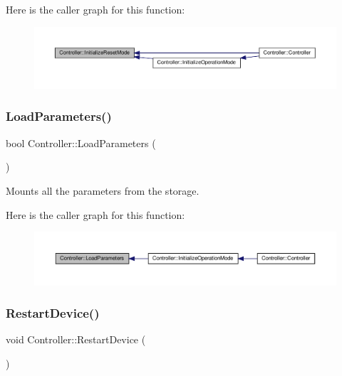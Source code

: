 Here is the caller graph for this function\+:
\nopagebreak
\begin{figure}[H]
\begin{center}
\leavevmode
\includegraphics[width=350pt]{classController_a97450864deedc5aaba0380b52a716292_icgraph}
\end{center}
\end{figure}
\mbox{\label{classController_abcd6a66cbded25a29989e1af162d3a69}} 
\subsubsection{\texorpdfstring{Load\+Parameters()}{LoadParameters()}}
{\footnotesize\ttfamily bool Controller\+::\+Load\+Parameters (\begin{DoxyParamCaption}{ }\end{DoxyParamCaption})\hspace{0.3cm}{\ttfamily [private]}}



Mounts all the parameters from the storage. 

Here is the caller graph for this function\+:
\nopagebreak
\begin{figure}[H]
\begin{center}
\leavevmode
\includegraphics[width=350pt]{classController_abcd6a66cbded25a29989e1af162d3a69_icgraph}
\end{center}
\end{figure}
\mbox{\label{classController_a99d30681a2e92b92098745e6a3608d10}} 
\subsubsection{\texorpdfstring{Restart\+Device()}{RestartDevice()}}
{\footnotesize\ttfamily void Controller\+::\+Restart\+Device (\begin{DoxyParamCaption}{ }\end{DoxyParamCaption})\hspace{0.3cm}{\ttfamily [private]}}



